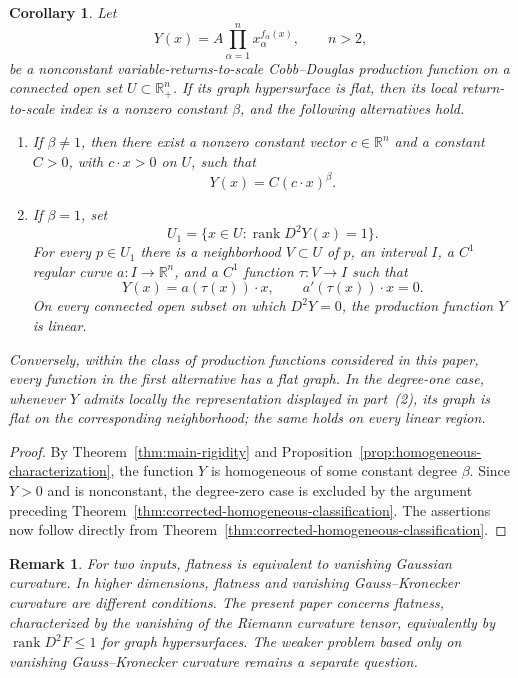 \documentclass[12pt]{amsart}
\newtheorem{corollary}{Corollary}[section]
\newtheorem{remark}{Remark}[section]
\begin{document}
\begin{corollary}\label{cor:local-classification-production}
Let
\[
Y(x)=A\prod_{\alpha=1}^{n}x_\alpha^{f_\alpha(x)},
\qquad n>2,
\]
be a nonconstant variable-returns-to-scale Cobb--Douglas production
function on a connected open set \(U\subset\mathbb R_+^n\). If its graph
hypersurface is flat, then its local return-to-scale index is
a nonzero constant \(\beta\), and the following alternatives hold.

\begin{enumerate}
\item If \(\beta\ne1\), then there exist a nonzero constant vector
\(c\in\mathbb R^n\) and a constant \(C>0\), with \(c\cdot x>0\) on
\(U\), such that
\[
Y(x)=C(c\cdot x)^\beta.
\]

\item If \(\beta=1\), set
\[
U_1=\{x\in U:\operatorname{rank}D^2Y(x)=1\}.
\]
For every \(p\in U_1\) there is a neighborhood \(V\subset U\) of
\(p\), an interval \(I\), a \(C^1\) regular curve
\(a:I\to\mathbb R^n\), and a \(C^1\) function \(\tau:V\to I\) such
that
\[
Y(x)=a(\tau(x))\cdot x,
\qquad
a'(\tau(x))\cdot x=0.
\]
On every connected open subset on which \(D^2Y=0\), the production
function \(Y\) is linear.
\end{enumerate}

Conversely, within the class of production functions considered in this
paper, every function in the first alternative has a flat
graph. In the degree-one case, whenever $Y$ admits locally the
representation displayed in part~(2), its graph is flat on
the corresponding neighborhood; the same holds on every linear region.
\end{corollary}

\begin{proof}
By Theorem~\ref{thm:main-rigidity} and
Proposition~\ref{prop:homogeneous-characterization}, the function \(Y\) is
homogeneous of some constant degree \(\beta\). Since \(Y>0\) and is
nonconstant, the degree-zero case is excluded by the argument preceding
Theorem~\ref{thm:corrected-homogeneous-classification}. The assertions now
follow directly from Theorem~\ref{thm:corrected-homogeneous-classification}.
\end{proof}

\begin{remark}
For two inputs,  flatness is equivalent to vanishing Gaussian curvature. In higher dimensions, flatness and vanishing Gauss--Kronecker curvature are different conditions. The present paper concerns flatness, characterized by the vanishing of the Riemann curvature tensor, equivalently by $\operatorname{rank}D^2F\le1$ for graph hypersurfaces. The weaker problem based only on vanishing Gauss--Kronecker curvature remains a separate question.
\end{remark}
\end{document}
